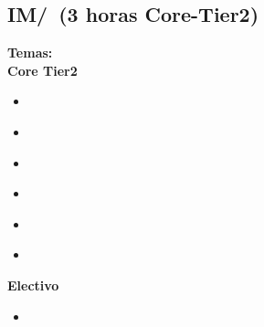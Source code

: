 \subsection{IM/\IMDatabaseSystems~(3 horas Core-Tier2)}\label{sec:BOK:IMDatabaseSystems}
\noindent \textbf{Temas:}\\
\noindent \textbf{Core Tier2}
\begin{itemize}
	\item \IMDatabaseSystemsTopicApproaches\label{sec:BOK:IMDatabaseSystemsTopicApproaches}
	\item \IMDatabaseSystemsTopicComponents\label{sec:BOK:IMDatabaseSystemsTopicComponents}
	\item \IMDatabaseSystemsTopicDesign\label{sec:BOK:IMDatabaseSystemsTopicDesign}
	\item \IMDatabaseSystemsTopicDatabase\label{sec:BOK:IMDatabaseSystemsTopicDatabase}
	\item \IMDatabaseSystemsTopicUse\label{sec:BOK:IMDatabaseSystemsTopicUse}
	\item \IMDatabaseSystemsTopicSystems\label{sec:BOK:IMDatabaseSystemsTopicSystems}
\end{itemize}

\noindent \textbf{Electivo}
\begin{itemize}
	\item \IMDatabaseSystemsTopicApproachesFor\label{sec:BOK:IMDatabaseSystemsTopicApproachesFor}
\end{itemize}


